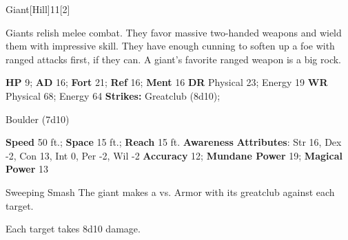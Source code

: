   \begin{monsection}{Giant}[Hill]{11}[2]
    \vspace{-1em}\vspace{-1em}
    \vspace{0em}

    
      Giants relish melee combat.
      They favor massive two-handed weapons and wield them with impressive skill.
      They have enough cunning to soften up a foe with ranged attacks first, if they can.
      A giant's favorite ranged weapon is a big rock.
    

    \begin{spellcontent}
      \begin{spelltargetinginfo}
        \pari \textbf{HP} 9;
          \textbf{AD} 16;
          \textbf{Fort} 21;
          \textbf{Ref} 16;
          \textbf{Ment} 16
        \pari \textbf{DR} Physical 23; Energy 19
        \pari \textbf{WR} Physical 68; Energy 64
        \pari \textbf{Strikes:}
            Greatclub  (8d10);
\par Boulder  (7d10)
      \end{spelltargetinginfo}
    \end{spellcontent}
    \begin{monsterfooter}
      \pari \textbf{Speed} 50 ft.;
        \textbf{Space} 15 ft.;
        \textbf{Reach} 15 ft.
      \pari \textbf{Awareness} 
      \pari \textbf{Attributes}:
        Str 16, Dex -2,
        Con 13, Int 0,
        Per -2, Wil -2
      \pari \textbf{Accuracy} 12;
        \textbf{Mundane Power} 19;
      \textbf{Magical Power} 13
    \end{monsterfooter}
  \end{monsection}
  \begin{freeability}{Sweeping Smash}
       The giant makes a 
         vs. Armor
        with its greatclub against each target.
    
    \hit Each target takes 8d10  damage.
    \end{freeability}
  
